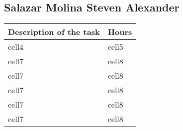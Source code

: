\subsection{Salazar Molina Steven Alexander}
\begin{center}
\renewcommand{\arraystretch}{1.5}

\begin{tabular}{ |m{7cm}|m{2cm}| } 
 \hline
 \textbf{Description of the task}  & \textbf{Hours} \\
 \hline
 cell4 & cell5 \\
 \hline
 cell7 & cell8 \\ 
 \hline
  cell7 & cell8 \\ 
 \hline 
 cell7 & cell8 \\ 
 \hline
 cell7 & cell8 \\ 
 \hline
 cell7 & cell8 \\ 
 \hline
\end{tabular}
\end{center}
